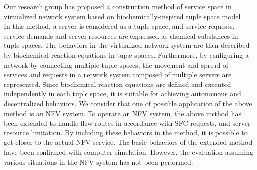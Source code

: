 \documentclass[technicalreport]{ieicej}
\begin{document}
	Our research group has proposed a construction method of service space in virtualized network system based on biochemically-inspired tuple space model~\cite{kokisakata2018masterthesis}.
	In this method, a server is considered as a tuple space, and service requests, service demands and server resources are expressed as chemical substances in tuple spaces.
	The behaviors in the virtualized network system are then described by biochemical reaction equations in  tuple spaces.
	Furthermore, by configuring a network by connecting multiple tuple spaces, the movement and spread of services and requests in a network system composed of multiple servers are represented.
	Since biochemical reaction equations are defined and executed independently in each tuple space, it is suitable for achieving autonomous and decentralized behaviors.
	We consider that one of possible application of the above method is an NFV system.
	To operate an NFV system, the above method has been extended to handle flow routes in accordance with SFC requests, and server resource limitation.
	By including these behaviors in the method, it is possible to get closer to the actual NFV service.
	The basic behaviors of the extended method have been confirmed with computer simulation.
	However, the evaluation assuming various situations in the NFV system has not been performed.
\end{document}
